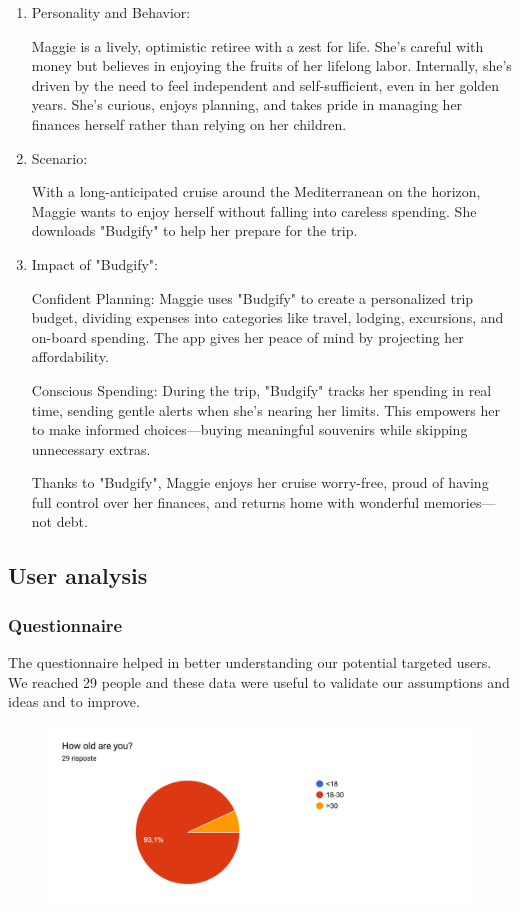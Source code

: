 \documentclass[a4paper,12pt]{article}
\begin{document}
\begin{enumerate}
    \item Personality and Behavior:
    
    Maggie is a lively, optimistic retiree with a zest for life. She’s careful with money but believes in enjoying the fruits of her lifelong labor. Internally, she’s driven by the need to feel independent and self-sufficient, even in her golden years. She's curious, enjoys planning, and takes pride in managing her finances herself rather than relying on her children.
    
    \item Scenario:
    
    With a long-anticipated cruise around the Mediterranean on the horizon, Maggie wants to enjoy herself without falling into careless spending. She downloads "Budgify" to help her prepare for the trip.
    
    \item Impact of "Budgify":
    
    Confident Planning: Maggie uses "Budgify" to create a personalized trip budget, dividing expenses into categories like travel, lodging, excursions, and on-board spending. The app gives her peace of mind by projecting her affordability.
    
    Conscious Spending: During the trip, "Budgify" tracks her spending in real time, sending gentle alerts when she’s nearing her limits. This empowers her to make informed choices—buying meaningful souvenirs while skipping unnecessary extras.
    
    Thanks to "Budgify", Maggie enjoys her cruise worry-free, proud of having full control over her finances, and returns home with wonderful memories—not debt.
\end{enumerate}
\subsection{User analysis}

\subsubsection{Questionnaire}
The questionnaire helped in better understanding our potential targeted users.
We reached 29 people and these data were useful to validate our assumptions and
ideas and to improve.
\begin{figure}[H]
    \centering
    \includegraphics[width=\linewidth]{imagequest9.jpg}
\end{figure}
\end{document}
